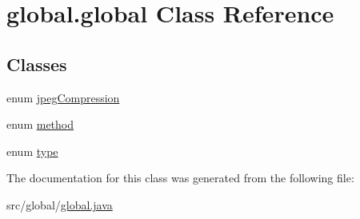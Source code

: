 \hypertarget{classglobal_1_1global}{}\section{global.\+global Class Reference}
\label{classglobal_1_1global}
\subsection*{Classes}
\begin{DoxyCompactItemize}
\item 
enum \hyperlink{enumglobal_1_1global_1_1jpegCompression}{jpeg\+Compression}
\item 
enum \hyperlink{enumglobal_1_1global_1_1method}{method}
\item 
enum \hyperlink{enumglobal_1_1global_1_1type}{type}
\end{DoxyCompactItemize}


The documentation for this class was generated from the following file\+:\begin{DoxyCompactItemize}
\item 
src/global/\hyperlink{global_8java}{global.\+java}\end{DoxyCompactItemize}
